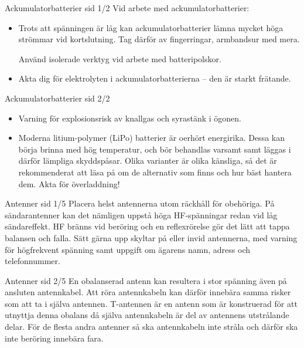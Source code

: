 \documentclass{beamer}
\begin{document}
\begin{frame}{Ackumulatorbatterier sid 1/2}
Vid arbete med ackumulatorbatterier:

\begin{itemize}
	\item Trots att spänningen är låg kan ackumulatorbatterier lämna
	mycket höga strömmar vid kortslutning.
	Tag därför av fingerringar, armbandsur med mera.

	Använd isolerade verktyg vid arbete med batteripolskor.
	\item Akta dig för elektrolyten i ackumulatorbatterierna -- den är
	starkt frätande.
\end{itemize}
\end{frame}

\begin{frame}{Ackumulatorbatterier sid 2/2}
\begin{itemize}
	\item Varning för explosionsrisk av knallgas och syrastänk i ögonen.
	\item Moderna litium-polymer (LiPo) batterier är oerhört energirika.
	Dessa kan börja brinna med hög temperatur, och bör behandlas varsamt samt
	läggas i därför lämpliga skyddspåsar.
	Olika varianter är olika känsliga, så det är rekommenderat att läsa på om
	de alternativ som finns och hur bäst hantera dem.
	Akta för överladdning!
\end{itemize}
\end{frame}

\begin{frame}{Antenner sid 1/5}
Placera helst antennerna utom räckhåll för obehöriga.
På sändarantenner kan det nämligen uppstå höga HF-spänningar redan vid
låg sändareffekt.
HF bränns vid beröring och en reflexrörelse gör det lätt att tappa balansen och
falla.
Sätt gärna upp skyltar på eller invid antennerna, med varning för högfrekvent
spänning samt uppgift om ägarens namn, adress och telefonnummer.
\end{frame}

\begin{frame}{Antenner sid 2/5}
En obalanserad antenn kan resultera i stor spänning även på ansluten
antennkabel.
Att röra antennkabeln kan därför innebära samma risker som att ta i själva
antennen.
T-antennen är en antenn som är konstruerad för att utnyttja denna obalans då
själva antennkabeln är del av antennens utstrålande delar.
För de flesta andra antenner så ska antennkabeln inte stråla och därför ska inte
beröring innebära fara.
\end{frame}
\end{document}
